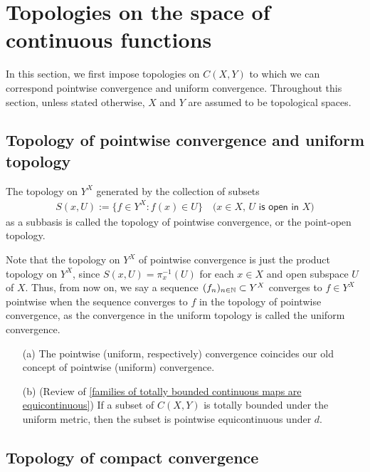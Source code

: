 \section{Topologies on the space of continuous functions}

In this section, we first impose topologies on $C(X, Y)$ to which we can correspond pointwise convergence and uniform convergence.
Throughout this section, unless stated otherwise, $X$ and $Y$ are assumed to be topological spaces.

\subsection{Topology of pointwise convergence and uniform topology}

\begin{defi}
    The topology on $Y^X$ generated by the collection of subsets
    \begin{align*}
        S(x, U):=\{f\in Y^X: f(x)\in U\}\quad\textsf{($x\in X$, $U$ is open in $X$)}
    \end{align*}
    as a subbasis is called the topology of pointwise convergence, or the point-open topology.
\end{defi}
Note that the topology on $Y^X$ of pointwise convergence is just the product topology on $Y^X$, since $S(x, U)=\pi_x^{-1}(U)$ for each $x\in X$ and open subspace $U$ of $X$.
Thus, from now on, we say a sequence $(f_n)_{n\in{\mathbb{N}}}\subset Y^X$ converges to $f\in Y^X$ pointwise when the sequence converges to $f$ in the topology of pointwise convergence, as the convergence in the uniform topology is called the uniform convergence.
\begin{rmk}
    \begin{enumerate}
        \item[(a)]
        {
            The pointwise (uniform, respectively) convergence coincides our old concept of pointwise (uniform) convergence.
        }
        \item[(b)]
        {
            (Review of \cref{families of totally bounded continuous maps are equicontinuous})
            If a subset of $C(X, Y)$ is totally bounded under the uniform metric, then the subset is pointwise equicontinuous under $d$.
        }
    \end{enumerate}
\end{rmk}


\subsection{Topology of compact convergence}

